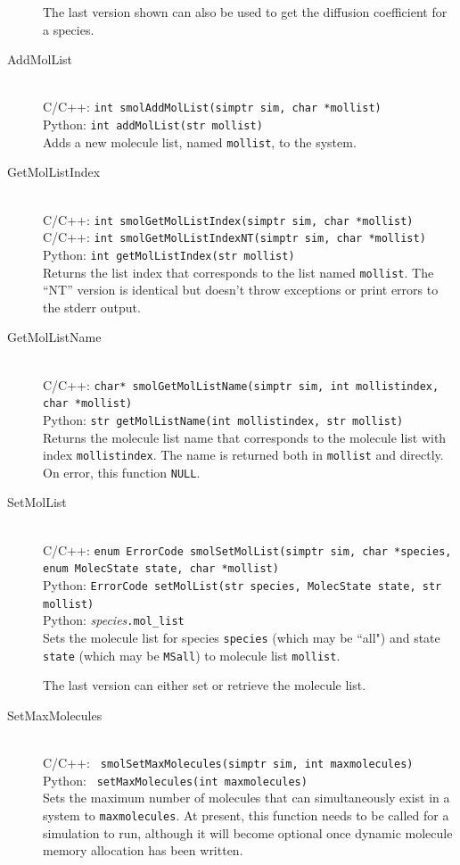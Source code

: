 \documentclass {scrbook}
\newcommand {\ttt} {\texttt}
\begin{document}
\begin{description}
The last version shown can also be used to get the diffusion coefficient for a species.


\item[AddMolList]
\hfill \\
C/C++: \ttt{int smolAddMolList(simptr sim, char *mollist)}\\
Python: \ttt{int addMolList(str mollist)}\\
Adds a new molecule list, named \ttt{mollist}, to the system.

\item[GetMolListIndex]
\hfill \\
C/C++: \ttt{int smolGetMolListIndex(simptr sim, char *mollist)}\\
C/C++: \ttt{int smolGetMolListIndexNT(simptr sim, char *mollist)}\\
Python: \ttt{int getMolListIndex(str mollist)}\\
Returns the list index that corresponds to the list named \ttt{mollist}. The ``NT'' version is identical but doesn't throw exceptions or print errors to the stderr output.

\item[GetMolListName]
\hfill \\
C/C++: \ttt{char* smolGetMolListName(simptr sim, int mollistindex, char *mollist)}\\
Python: \ttt{str getMolListName(int mollistindex, str mollist)}\\
Returns the molecule list name that corresponds to the molecule list with index \ttt{mollistindex}. The name is returned both in \ttt{mollist} and directly. On error, this function \ttt{NULL}.

\item[SetMolList]
\hfill \\
C/C++: \ttt{enum ErrorCode smolSetMolList(simptr sim, char *species, enum MolecState state, char *mollist)}\\
Python: \ttt{ErrorCode setMolList(str species, MolecState state, str mollist)}\\
Python: \textit{species}\ttt{.mol\_list}\\
Sets the molecule list for species \ttt{species} (which may be ``all") and state \ttt{state} (which may be \ttt{MSall}) to molecule list \ttt{mollist}.

The last version can either set or retrieve the molecule list.

\item[SetMaxMolecules]
\hfill \\
C/C++: \ttt{ smolSetMaxMolecules(simptr sim, int maxmolecules)}\\
Python: \ttt{ setMaxMolecules(int maxmolecules)}\\
Sets the maximum number of molecules that can simultaneously exist in a system to \ttt{maxmolecules}. At present, this function needs to be called for a simulation to run, although it will become optional once dynamic molecule memory allocation has been written.


\end{description}
\end{document}
